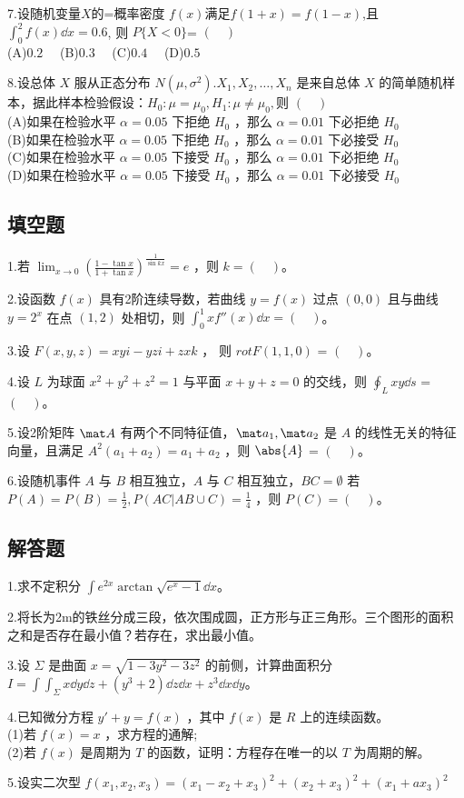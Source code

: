 7.设随机变量$X$的=概率密度 $f(x)$满足$f(1+x)=f(1-x)$,且 $\int_0^2 f(x)\dd{x}=0.6$, 则 $P\{X<0\}$= $(\quad)$\\
(A)$0.2 \quad$
(B)$0.3 \quad$
(C)$0.4 \quad$
(D)$0.5 \quad$


8.设总体 $X$ 服从正态分布 $N(\mu,\sigma^2).X_1,X_2,\dots,X_n$ 是来自总体 $X$ 的简单随机样本，据此样本检验假设：$H_0:\mu=\mu_0,H_1:\mu\neq \mu_0,$则 $(\quad)$\\
(A)如果在检验水平 $\alpha=0.05$ 下拒绝 $H_0$ ，那么 $\alpha=0.01$ 下必拒绝 $H_0$\\
(B)如果在检验水平 $\alpha=0.05$ 下拒绝 $H_0$ ，那么 $\alpha=0.01$ 下必接受 $H_0$\\
(C)如果在检验水平 $\alpha=0.05$ 下接受 $H_0$ ，那么 $\alpha=0.01$ 下必拒绝 $H_0$\\
(D)如果在检验水平 $\alpha=0.05$ 下接受 $H_0$ ，那么 $\alpha=0.01$ 下必接受 $H_0$

\subsection{填空题}
1.若 $\displaystyle \lim_{x \to  0} (\frac{1-\tan x}{1+\tan x})^\frac{1}{\sin kx}=e$ ，则 $k=(\quad)$。

2.设函数 $f(x)$ 具有2阶连续导数，若曲线 $y=f(x)$ 过点 $(0,0)$ 且与曲线 $y=2^x$ 在点 $(1,2)$ 处相切，则 $\int_0^1 xf''(x) \dd{x}= (\quad)$。

3.设 $F(x,y,z)=xyi-yzi+zxk$ ， 则 $rot  F(1,1,0)$ = $(\quad)$。

4.设 $L$ 为球面 $x^2+y^2+z^2=1$ 与平面 $x+y+z=0$ 的交线，则 $\oint_L xy\dd{s}$ = $(\quad)$。

5.设2阶矩阵 $\mat A$ 有两个不同特征值，$\mat a_1,\mat a_2$  是 $A$ 的线性无关的特征向量，且满足 $A^2(a_1+a_2)=a_1+a_2$ ，则 $\abs{A}$ = $(\quad)$。

6.设随机事件 $A$ 与 $B$ 相互独立，$A$ 与 $C$ 相互独立，$BC=\emptyset$ 若 $P(A)=P(B)=\frac{1}{2},P(AC|AB \cup C)=\frac{1}{4}$ ，则 $P(C)= (\quad)$。

\subsection{解答题}
1.求不定积分 $\displaystyle \int e^{2x}\arctan \sqrt{e^x-1}\dd{x}$。

2.将长为2m的铁丝分成三段，依次围成圆，正方形与正三角形。三个图形的面积之和是否存在最小值？若存在，求出最小值。

3.设 $\Sigma$ 是曲面 $x=\sqrt{1-3y^2-3z^2}$ 的前侧，计算曲面积分 $\displaystyle I=\int\int_\Sigma x\dd{y}\dd{z}+(y^3+2)\dd{z}\dd{x}+z^3 \dd{x}\dd{y}$。

4.已知微分方程 $y'+y=f(x)$ ，其中 $f(x)$ 是 $R$ 上的连续函数。\\
(1)若 $f(x)=x$ ，求方程的通解;\\
(2)若 $f(x)$ 是周期为 $T$ 的函数，证明：方程存在唯一的以 $T$ 为周期的解。

5.设实二次型 $f(x_1,x_2,x_3)=(x_1-x_2+x_3)^2+(x_2+x_3)^2+(x_1+ax_3)^2$